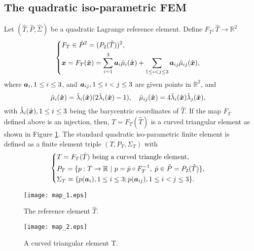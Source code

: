 \documentclass[12pt]{article}
\renewcommand{\vec}[1]{\mbox{\boldmath$#1$}}
\numberwithin{equation}{section}
\begin{document}
\subsection{The quadratic iso-parametric FEM}
Let $(\hat{T},\hat{P},\hat{\Sigma})$ be a quadratic Lagrange reference
element. Define $F_T:\hat{T}\rightarrow \mathbb{R}^2$
\begin{equation}\label{e:quadratic_mapping}
        \left\{
                \begin{aligned}
                   & F_T\in \hat{P}^2=(P_2(\hat{T}))^2,\\
                   &\vec{x}=F_T(\hat{\vec{x}})=
                   \sum\limits_{i=1}^{3}\vec{a}_i\hat{\mu}_i(\hat{\vec{x}})+
        \sum\limits_{1\leq i<j\leq 3}\vec{a}_{ij} \hat{\mu}_{ij}(\hat{\vec{x}}),
                \end{aligned}
         \right .
    \end{equation}
where $\vec{a}_i,1\leq i\leq 3$, and $\vec{a}_{ij},1\leq i<j\leq 3$ are given points
in $\mathbb{R}^2$, and
$$
\hat{\mu}_i(\hat{\vec{x}})=\hat{\lambda}_i(\hat{\vec{x}})(2\hat{\lambda}_i
(\hat{\vec{x}})-1), \quad \hat{\mu}_{ij}(\hat{\vec{x}})=
4\hat{\lambda}_i(\hat{\vec{x}})\hat{\lambda}_j(\hat{\vec{x}}),
$$
with $\hat{\lambda}_i(\hat{\vec{x}}),1\leq i\leq 3$ being the barycentric
coordinates of $\hat{T}$.
If the map $F_T$ defined above is an injection, then, $T=F_T(\hat{T})$ is a
curved triangular element as shown in Figure \ref{dengcan curved element}.
The standard quadratic iso-parametric finite element is defined as a finite
element triple $(T,P_T,\Sigma_T)$ with
\begin{equation}
 \label{iso_element}
    \left\{
        \begin{aligned}
  &   T=F_T(\hat{T}) \text{ being a curved triangle element},\\
  &   P_T=\{p:T\rightarrow\mathbb{R}~|~p=\hat{p}\circ F_T^{-1},\;
  \hat{p}\in\hat{P}=P_2(\hat{T})\},\\
  &   \Sigma_T=\{p(\vec{a}_i),1\le i\le 3; p(\vec{a}_{ij}),1\le i<j\le 3\}.
   \end{aligned}
   \right .
\end{equation}

\begin{figure}[h!]
 \begin{minipage}[l]{0.5\textwidth}
 \centering \texttt{[image: map\_1.eps]}
 \caption{The reference element $\hat{T}$.} \label{dengcan reference element}
\end{minipage}
\begin{minipage}[l]{0.5\textwidth}
 \centering \texttt{[image: map\_2.eps]}
 \caption{A curved triangular element T.}\label{dengcan curved element}
\end{minipage}
\end{figure}
\end{document}
